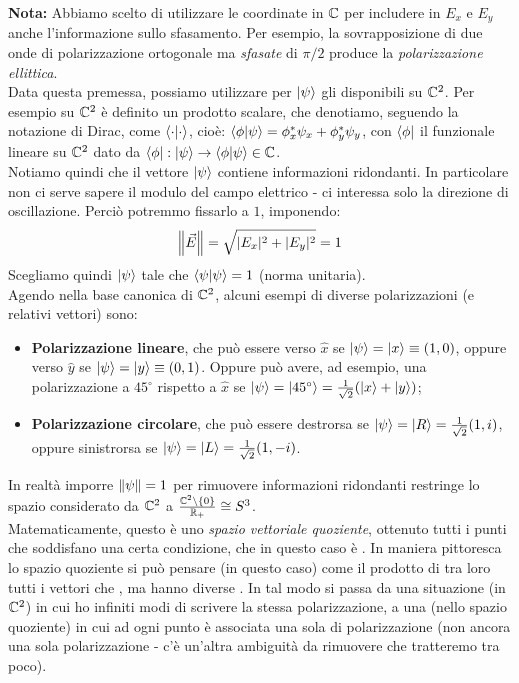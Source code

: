 \documentclass[FisicaTeorica.tex]{subfiles}
\begin{document}
\textbf{Nota:} Abbiamo scelto di utilizzare le coordinate in $\mathbb{C}$ per includere in $E_x$ e $E_y$ anche l'informazione sullo sfasamento. Per esempio, la sovrapposizione di due onde di polarizzazione ortogonale ma \textit{sfasate} di $\pi/2$ produce la \textit{polarizzazione ellittica}.\\
Data questa premessa, possiamo utilizzare per $\ket{\psi}$ gli  disponibili su $\mathbb{C}^2$. Per esempio su $\mathbb{C}^2$ è definito un prodotto scalare, che denotiamo, seguendo la notazione di Dirac, come $\braket{ \cdot |  \cdot }$, cioè: $\braket{\phi|\psi} = \phi_x^* \psi_x + \phi_y^* \psi_y$, con $\bra{\phi}$ il funzionale lineare su $\mathbb{C}^2$ dato da $\bra{\phi}: \ket{\psi} \to \braket{\phi|\psi} \in \mathbb{C}$.\\
Notiamo quindi che il vettore $\ket{\psi}$ contiene informazioni ridondanti. In particolare non ci serve sapere il modulo del campo elettrico - ci interessa solo la direzione di oscillazione. Perciò potremmo fissarlo a $1$, imponendo: 
\[
\left\lVert\vec{E}\right\rVert = \sqrt{|E_x|^2 + |E_y|^2} = 1
\]
Scegliamo quindi $\ket{\psi}$ tale che $\braket{\psi|\psi} = 1$ (norma unitaria).\\
Agendo nella base canonica di $\mathbb{C}^2$, alcuni esempi di diverse polarizzazioni (e relativi vettori) sono:
\begin{itemize}
    \item \textbf{Polarizzazione lineare}, che può essere verso $\hat{x}$ se $\ket\psi = \ket{x} \equiv (1,0)$, oppure verso $\hat{y}$ se $\ket\psi = \ket{y}\equiv (0,1)$. Oppure può avere, ad esempio, una polarizzazione a $45^\circ$ rispetto a $\hat{x}$ se $\ket\psi = \ket{45^\circ} = \frac{1}{\sqrt{2}}(\ket{x}+\ket{y})$;
    \item \textbf{Polarizzazione circolare}, che può essere destrorsa se $\ket\psi = \ket{R} = \frac{1}{\sqrt{2}}(1,i)$, oppure sinistrorsa se $\ket\psi = \ket{L} = \frac{1}{\sqrt{2}}(1,-i)$.
\end{itemize}
In realtà imporre $\left\lVert\psi\right\rVert = 1$ per rimuovere informazioni ridondanti restringe lo spazio considerato da $\mathbb{C}^2$ a $\frac{\mathbb{C}^2\setminus\{0\}}{\mathbb{R}_+} \cong S^3$.\\
Matematicamente, questo è uno \textit{spazio vettoriale quoziente}, ottenuto  tutti i punti che soddisfano una certa condizione, che in questo caso è . In maniera pittoresca lo spazio quoziente si può pensare (in questo caso) come il prodotto di  tra loro tutti i vettori che , ma hanno diverse . In tal modo si passa da una situazione (in $\mathbb{C}^2$) in cui ho infiniti modi di scrivere la stessa polarizzazione, a una (nello spazio quoziente) in cui ad ogni punto è associata una sola  di polarizzazione (non ancora una sola polarizzazione - c'è un'altra ambiguità da rimuovere che tratteremo tra poco).\\
\end{document}
